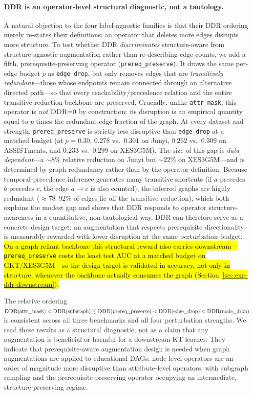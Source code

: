 \documentclass[pdflatex,sn-mathphys-num]{sn-jnl}
\newcommand{\DDR}{\textsc{DDR}}
\newcommand{\rev}[1]{\hl{#1}}
\newcommand{\rev}[1]{#1}
\begin{document}
\paragraph{\DDR{} is an operator-level structural diagnostic, not a tautology.}
A natural objection to the four label-agnostic families is that their
\DDR{} ordering merely re-states their definitions: an operator that
deletes more edges disrupts more structure. To test whether \DDR{}
\emph{discriminates} structure-aware from structure-agnostic
augmentation rather than re-describing edge counts, we add a fifth,
prerequisite-preserving operator (\texttt{prereq\_preserve}). It draws
the same per-edge budget $p$ as \texttt{edge\_drop}, but only removes
edges that are \emph{transitively redundant}---those whose endpoints
remain connected through an alternative directed path---so that every
reachability/precedence relation and the entire transitive-reduction
backbone are preserved. Crucially, unlike \texttt{attr\_mask}, this
operator is \emph{not} $\DDR{=}0$ by construction: its disruption is an
empirical quantity equal to $p$ times the redundant-edge fraction of the
graph. At every dataset and strength, \texttt{prereq\_preserve} is
strictly less disruptive than \texttt{edge\_drop} at a matched budget
(at $p=0.30$, $0.278$ vs.\ $0.301$ on Junyi, $0.262$ vs.\ $0.309$ on
ASSISTments, and $0.233$ vs.\ $0.299$ on XES3G5M). The size of this gap
is \emph{data-dependent}---a $\sim 8\%$ relative reduction on Junyi but
$\sim 22\%$ on XES3G5M---and is determined by graph redundancy rather
than by the operator definition. Because temporal-precedence inference
generates many transitive shortcuts (if $a$ precedes $b$ precedes $c$,
the edge $a\!\to\!c$ is also counted), the inferred graphs are
highly redundant ($\approx 78$--$92\%$ of edges lie off the transitive
reduction), which both explains the modest gap and shows that \DDR{}
responds to operator structure-awareness in a quantitative,
non-tautological way. \DDR{} can therefore serve as a concrete design
target: an augmentation that respects prerequisite directionality is
measurably rewarded with lower disruption at the same perturbation
budget. \rev{On a graph-reliant backbone this structural reward also carries
downstream---\mbox{\texttt{prereq\_preserve}} costs the least test AUC at a matched
budget on GKT/XES3G5M---so the design target is validated in accuracy, not
only in structure, whenever the backbone actually consumes the graph
(\mbox{Section~\ref{sec:exp-ddr-downstream}}).}

The relative ordering
$\DDR(\text{attr\_mask}) < \DDR(\text{subgraph}) \lesssim
\DDR(\text{prereq\_preserve}) < \DDR(\text{edge\_drop}) <
\DDR(\text{node\_drop})$
is consistent across all three benchmarks and all four perturbation
strengths. We read these results as a structural diagnostic, not as a
claim that any augmentation is beneficial or harmful for a downstream
KT learner. They indicate that prerequisite-aware augmentation design
is needed when graph augmentations are applied to educational DAGs:
node-level operators are an order of magnitude more disruptive than
attribute-level operators, with subgraph sampling and the
prerequisite-preserving operator occupying an intermediate,
structure-preserving regime.
\end{document}
